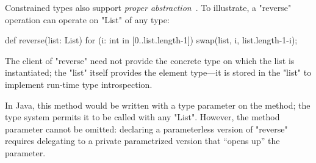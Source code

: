 
Constrained types also support
\emph{proper abstraction}~\cite{adding-wildcards}.  To illustrate, a
\xcd"reverse"
operation can operate on \xcd"List" of any type:
{
\begin{xten}
def reverse(list: List) {
  for (i: int in [0..list.length-1])
    swap(list, i, list.length-1-i);
}
\end{xten}}

The client of \xcd"reverse" need not provide the concrete type
on which the list is instantiated; the \xcd"list" itself
provides the element type---it is stored in the \xcd"list"
to implement run-time type introspection.

In Java, this method would be written with a type parameter on
the method; the type system permits it to be called with any
\xcd"List".
However,
the method parameter cannot be omitted: declaring a parameterless version
of \xcd"reverse" requires delegating to a private parametrized version that
``opens up'' the parameter.

%



